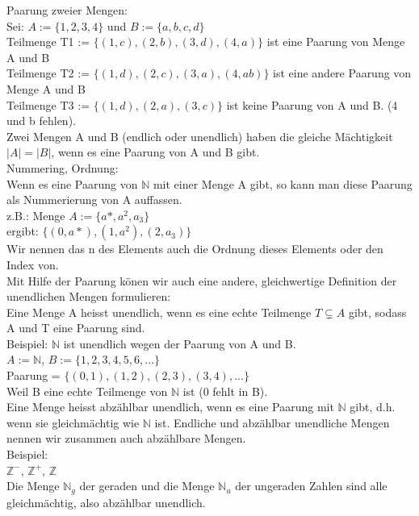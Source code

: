 \documentclass[../gruppenarbeit_1.tex]{subfiles}
\begin{document}
Paarung zweier Mengen:\\
Sei: $A := \{1,2,3,4\}$ und $B := \{a,b,c,d\}$\\
Teilmenge T1 := $\{(1,c),(2,b),(3,d),(4,a)\}$ ist eine Paarung von Menge A und B\\
Teilmenge T2 := $\{(1,d),(2,c),(3,a),(4,ab)\}$ ist eine andere Paarung von Menge A und B\\
Teilmenge T3 := $\{(1,d),(2,a),(3,c)\}$ ist keine Paarung von A und B. (4 und b fehlen).\\

Zwei Mengen A und B (endlich oder unendlich) haben die gleiche Mächtigkeit $|A| = |B|$, wenn es eine Paarung von A und B gibt.\\

Nummering, Ordnung:\\
Wenn es eine Paarung von $\mathbb{N}$ mit einer Menge A gibt, so kann man diese Paarung als Nummerierung von A auffassen. \\
z.B.: Menge $A := \{a*,a^2, a_3\}$\\
ergibt: $\{(0,a*),(1,a^2),(2,a_3)\}$\\

Wir nennen das n des Elements auch die Ordnung dieses Elements oder den Index von.\\

Mit Hilfe der Paarung könen wir auch eine andere, gleichwertige Definition der unendlichen Mengen formulieren:\\
Eine Menge A heisst unendlich, wenn es eine echte Teilmenge $T \subsetneq A$ gibt, sodass A und T eine Paarung sind.\\
Beispiel: $\mathbb{N}$ ist unendlich wegen der Paarung von A und B.\\
$A := \mathbb{N}$, $B := \{1,2,3,4,5,6,...\}$\\
Paarung = $\{(0,1),(1,2),(2,3),(3,4),...\}$\\
Weil B eine echte Teilmenge von $\mathbb{N}$ ist (0 fehlt in B).\\

Eine Menge heisst abzählbar unendlich, wenn es eine Paarung mit $\mathbb{N}$ gibt, d.h. wenn sie gleichmächtig wie $\mathbb{N}$ ist.
Endliche und abzählbar unendliche Mengen nennen wir zusammen auch abzählbare Mengen.\\

Beispiel:\\
$\mathbb{Z}^-$, $\mathbb{Z}^+$, $\mathbb{Z}$\\
Die Menge $\mathbb{N}_g$ der geraden und die Menge $\mathbb{N}_u$ der ungeraden Zahlen sind alle gleichmächtig, also abzählbar unendlich.\\
\end{document}
